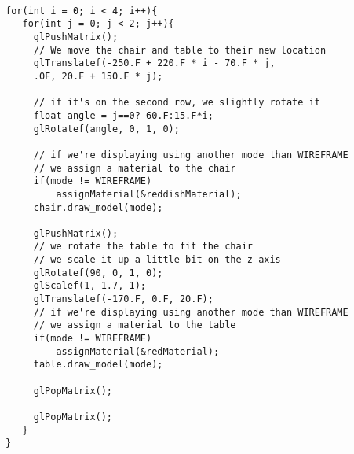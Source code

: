 \documentclass{beamer}
\begin{document}
\begin{frame}[fragile]
\tiny
\begin{lstlisting}

for(int i = 0; i < 4; i++){
   for(int j = 0; j < 2; j++){
     glPushMatrix();
     // We move the chair and table to their new location
     glTranslatef(-250.F + 220.F * i - 70.F * j,
     .0F, 20.F + 150.F * j);

     // if it's on the second row, we slightly rotate it
     float angle = j==0?-60.F:15.F*i;
     glRotatef(angle, 0, 1, 0);

     // if we're displaying using another mode than WIREFRAME
     // we assign a material to the chair
     if(mode != WIREFRAME)
         assignMaterial(&reddishMaterial);
     chair.draw_model(mode);

     glPushMatrix();
     // we rotate the table to fit the chair
     // we scale it up a little bit on the z axis
     glRotatef(90, 0, 1, 0);
     glScalef(1, 1.7, 1);
     glTranslatef(-170.F, 0.F, 20.F);
     // if we're displaying using another mode than WIREFRAME
     // we assign a material to the table
     if(mode != WIREFRAME)
         assignMaterial(&redMaterial);
     table.draw_model(mode);

     glPopMatrix();

     glPopMatrix();
   }
}
\end{lstlisting}
\end{frame}
\end{document}
